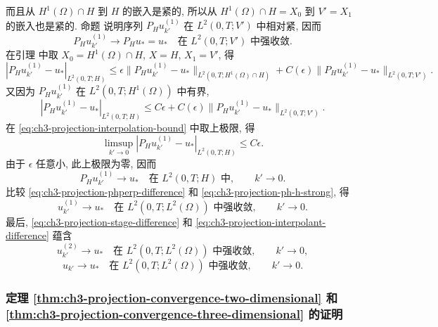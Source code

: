 \hypertarget{chapter-03-page-289}{}
而且从 $H^1(\Omega)\cap H$ 到 $H$ 的嵌入是紧的, 所以从 $H^1(\Omega)\cap H=X_0$ 到 $V'=X_1$ 的嵌入也是紧的. 命题  说明序列 $P_Hu_{k'}^{(1)}$ 在 $L^2(0,T;V')$ 中相对紧, 因而
\begin{equation}
P_Hu_{k'}^{(1)}\longrightarrow P_Hu_*=u_*
\quad\text{在 }L^2(0,T;V')\text{ 中强收敛}.
\label{eq:ch3-projection-ph-vprime-strong}
\end{equation}
在引理  中取 $X_0=H^1(\Omega)\cap H$, $X=H$, $X_1=V'$, 得
\[
|P_Hu_{k'}^{(1)}-u_*|_{L^2(0,T;H)}
\leq\epsilon\lVert P_Hu_{k'}^{(1)}-u_*\rVert_{L^2(0,T;H^1(\Omega)\cap H)}
+C(\epsilon)\lVert P_Hu_{k'}^{(1)}-u_*\rVert_{L^2(0,T;V')}.
\]
又因为 $P_Hu_{k'}^{(1)}$ 在 $L^2(0,T;H^1(\Omega))$ 中有界,
\begin{equation}
|P_Hu_{k'}^{(1)}-u_*|_{L^2(0,T;H)}
\leq C\epsilon
+C(\epsilon)\lVert P_Hu_{k'}^{(1)}-u_*\rVert_{L^2(0,T;V')}.
\label{eq:ch3-projection-interpolation-bound}
\end{equation}
在 \eqref{eq:ch3-projection-interpolation-bound} 中取上极限, 得
\[
\limsup_{k'\to0}|P_Hu_{k'}^{(1)}-u_*|_{L^2(0,T;H)}\leq C\epsilon.
\]
由于 $\epsilon$ 任意小, 此上极限为零, 因而
\begin{equation}
P_Hu_{k'}^{(1)}\longrightarrow u_*
\quad\text{在 }L^2(0,T;H)\text{ 中},\qquad k'\to0.
\label{eq:ch3-projection-ph-h-strong}
\end{equation}
比较 \eqref{eq:ch3-projection-phperp-difference} 和 \eqref{eq:ch3-projection-ph-h-strong}, 得
\begin{equation}
u_{k'}^{(1)}\longrightarrow u_*
\quad\text{在 }L^2(0,T;L^2(\Omega))\text{ 中强收敛},\qquad k'\to0.
\label{eq:ch3-projection-u1-l2-strong}
\end{equation}
最后, \eqref{eq:ch3-projection-stage-difference} 和 \eqref{eq:ch3-projection-interpolant-difference} 蕴含
\begin{equation}
u_{k'}^{(2)}\longrightarrow u_*
\quad\text{在 }L^2(0,T;L^2(\Omega))\text{ 中强收敛},\qquad k'\to0,
\label{eq:ch3-projection-u2-l2-strong}
\end{equation}
\begin{equation}
u_{k'}\longrightarrow u_*
\quad\text{在 }L^2(0,T;L^2(\Omega))\text{ 中强收敛},\qquad k'\to0.
\label{eq:ch3-projection-uk-l2-strong}
\end{equation}

\subsubsection{定理 \ref{thm:ch3-projection-convergence-two-dimensional} 和 \ref{thm:ch3-projection-convergence-three-dimensional} 的证明}
\label{subsubsec:ch3-projection-convergence-proof}

